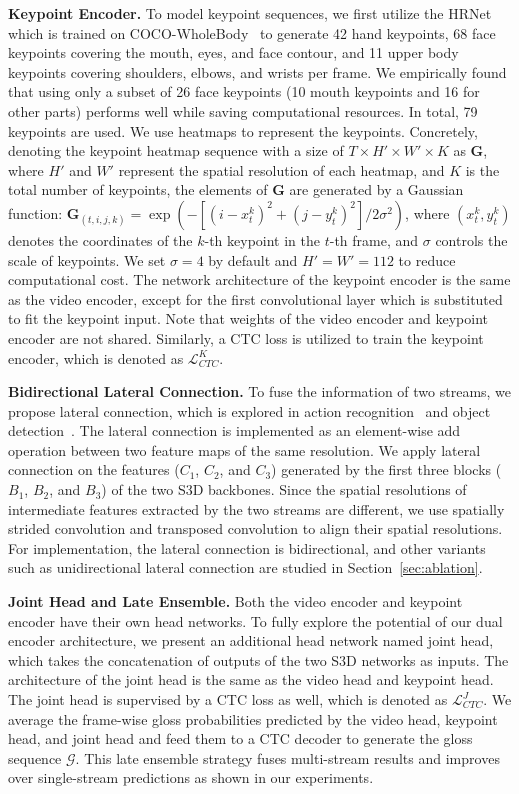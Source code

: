 \documentclass{article}
\begin{document}
\textbf{Keypoint Encoder.} To model keypoint sequences, we first utilize the HRNet~\cite{wang2020deep} which is trained on COCO-WholeBody~\cite{jin2020whole} to generate 42 hand keypoints, 68 face keypoints covering the mouth, eyes, and face contour, and 11 upper body keypoints covering shoulders, elbows, and wrists per frame. We empirically found that using only a subset of 26 face keypoints (10 mouth keypoints and 16 for other parts) performs well while saving computational resources. In total, 79 keypoints are used. We use heatmaps to represent the keypoints. 
Concretely, denoting the keypoint heatmap sequence with a size of $T\times H' \times W' \times K$ as $\mathbf{G}$, where $H'$ and $W'$ represent the spatial resolution of each heatmap, and $K$ is the total number of keypoints, the elements of $\mathbf{G}$ are generated by a Gaussian function: $\mathbf{G}_{(t,i,j,k)} = \exp \left( -[(i-x_t^k)^2 + (j-y_t^k)^2]/2\sigma^2 \right)$, where $(x_t^k, y_t^k)$ 
denotes the coordinates of the $k$-th keypoint in the $t$-th frame, and $\sigma$ controls the scale of keypoints. We set $\sigma=4$ by default and $H'=W'=112$ to reduce computational cost. The network architecture of the keypoint encoder is the same as the video encoder, except for the first convolutional layer which is substituted to fit the keypoint input. Note that weights of the video encoder and keypoint encoder are not shared. Similarly, a CTC loss is utilized to train the keypoint encoder, which is denoted as $\mathcal{L}^{K}_{CTC}$.

\textbf{Bidirectional Lateral Connection.}
To fuse the information of two streams, we propose lateral connection, which is explored in action recognition~\cite{feichtenhofer2019slowfast,christoph2016spatiotemporal,feichtenhofer2016convolutional,duan2021revisiting} and object detection~\cite{lin2017feature}. The lateral connection is implemented as an element-wise add operation between two feature maps of the same resolution. We apply lateral connection on the features ($C_1$, $C_2$, and $C_3$) generated by the first three blocks ($B_1$, $B_2$, and $B_3$) of the two S3D backbones. Since the spatial resolutions of intermediate features extracted by the two streams are different, we use spatially strided convolution and transposed convolution to align their spatial resolutions. For implementation, the lateral connection is bidirectional, and other variants such as unidirectional lateral connection are studied in Section~\ref{sec:ablation}.


\textbf{Joint Head and Late Ensemble.}
Both the video encoder and keypoint encoder have their own head networks. To fully explore the potential of our dual encoder architecture, we present an additional head network named joint head, which takes the concatenation of outputs of the two S3D networks as inputs. The architecture of the joint head is the same as the video head and keypoint head. The joint head is supervised by a CTC loss as well, which is denoted as $\mathcal{L}^{J}_{CTC}$. We average the frame-wise gloss probabilities predicted by the video head, keypoint head, and joint head and feed them to a CTC decoder to generate the gloss sequence $\mathcal{G}$. This late ensemble strategy fuses multi-stream results and improves over single-stream predictions as shown in our experiments.
\end{document}
